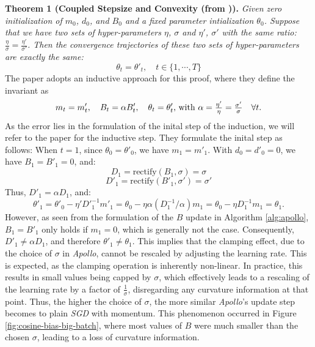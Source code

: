 \noindent\textbf{Theorem 1 (Coupled Stepsize and Convexity (from \cite{apollo})).} 
\textit{Given zero initialization of $m_0$, $d_0$, and $B_0$ and a fixed parameter intialization
$\theta_0$. Suppose that we have two sets of hyper-parameters $\eta$, $\sigma$ and $\eta'$, $\sigma'$ with the same ratio:
$\frac{\eta}{\sigma} = \frac{\eta'}{\sigma'}$. Then the convergence trajectories of these two sets of hyper-parameters are exactly
the same:
        \[ \theta_{t} = \theta'_{t}, \quad t \in \{1,\cdots,T \}\]
}
The paper adopts an inductive approach for this proof, where they define the invariant as 
\begin{equation}
    m_t = m'_t, \quad B_t = \alpha B'_t, \quad \theta_t = \theta'_t$, with $\alpha = \frac{\eta'}{\eta} = \frac{\sigma'}{\sigma} \quad \forall t.
\end{equation}
As the error lies in the formulation of the inital step of the induction, we will refer to the paper\cite{apollo} for the inductive step. 
They formulate the  inital step  as follows:
When $t = 1$, since $\theta_0 = \theta'_0$, we have $m_1 = m'_1$. With $d_0 = d'_0 = 0$, we have $B_1 = B'_1 = 0$, and:
\[
D_1 = \text{rectify}(B_1, \sigma) = \sigma
\]
\[
D'_1 = \text{rectify}(B'_1, \sigma') = \sigma'
\]
Thus, $D'_1 = \alpha D_1$, and:
\[
\theta'_1 = \theta'_0 - \eta' D'^{-1}_1 m'_1 = \theta_0 - \eta \alpha (D_1^{-1} / \alpha) m_1 = \theta_0 - \eta D_1^{-1} m_1 = \theta_1.
\]
However, as seen from the formulation of the $B$ update in Algorithm \ref{alg:apollo}, $B_1 = B'_1$ only holds if $m_1 = 0$,
which is generally not the case. Consequently, $D'_1 \neq \alpha D_1$, and therefore $\theta'_1 \neq \theta_1$.
This implies that the clamping effect, due to the choice of $\sigma$ in \emph{Apollo}, cannot be rescaled by adjusting the learning rate. 
This is expected, as the clamping operation is inherently non-linear.
In practice, this results in small values being capped by $\sigma$, which effectively leads to a rescaling of the learning rate by a 
factor of $\frac{1}{\sigma}$, disregarding any curvature information at that point. Thus, the higher the choice of $\sigma$,
the more similar \emph{Apollo}'s update step becomes to plain \emph{SGD} with momentum.
This phenomenon occurred in Figure \ref{fig:cosine-bias-big-batch}, where most values of $B$ were much smaller than the chosen $\sigma$,
leading to a loss of curvature information.






